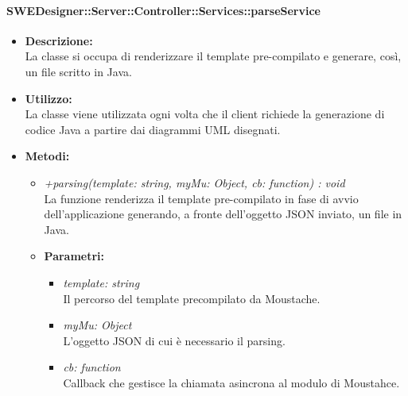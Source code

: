       \paragraph{SWEDesigner::Server::Controller::Services::parseService}
        \begin{itemize}
          \item \textbf{Descrizione:}\\
          La classe si occupa di renderizzare il template pre-compilato e generare, così, un file scritto in Java.
          \item \textbf{Utilizzo:}\\
          La classe viene utilizzata ogni volta che il client richiede la generazione di codice Java a partire dai diagrammi UML disegnati.
          \item \textbf{Metodi:}\\
          \begin{itemize}
            \item \emph{+parsing(template: string, myMu: Object, cb: function) : void}\\
            La funzione renderizza il template pre-compilato in fase di avvio dell'applicazione generando, a fronte dell'oggetto JSON inviato, un file in Java.
            \item \textbf{Parametri: }\\
            \begin{itemize}
              \item \emph{template: string}\\
              Il percorso del template precompilato da Moustache.
              \item \emph{myMu: Object}\\
              L'oggetto JSON di cui è necessario il parsing.
              \item \emph{cb: function}\\
              Callback che gestisce la chiamata asincrona al modulo di Moustahce.
            \end{itemize}
        \end{itemize}
       \end{itemize}
